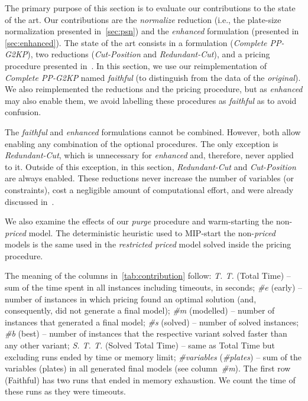 \documentclass[ppgc,prop-tese,english,formais,babel]{iiufrgs}
\begin{document}
The primary purpose of this section is to evaluate our contributions to the state of the art.
Our contributions are the \emph{normalize} reduction (i.e., the plate-size normalization presented in~\cref{sec:psn}) and the \emph{enhanced} formulation (presented in \cref{sec:enhanced}).
The state of the art consists in a formulation (\emph{Complete PP-G2KP}), two reductions (\emph{Cut-Position} and \emph{Redundant-Cut}), and a pricing procedure presented in~\citet{furini:2016,dimitri_thesis}.
In this section, we use our reimplementation of \emph{Complete PP-G2KP} named \emph{faithful} (to distinguish from the data of the \emph{original}).
We also reimplemented the reductions and the pricing procedure, but as \emph{enhanced} may also enable them, we avoid labelling these procedures as \emph{faithful} as to avoid confusion.

The \emph{faithful} and \emph{enhanced} formulations cannot be combined.
However, both allow enabling any combination of the optional procedures.
The only exception is \emph{Redundant-Cut}, which is unnecessary for \emph{enhanced} and, therefore, never applied to it.
Outside of this exception, in this section, \emph{Redundant-Cut} and \emph{Cut-Position} are always enabled.
These reductions never increase the number of variables (or constraints), cost a negligible amount of computational effort, and were already discussed in~\citet{furini:2016,dimitri_thesis}.

We also examine the effects of our \emph{purge} procedure and warm-starting the non-\emph{priced} model.
The deterministic heuristic used to MIP-start the non-\emph{priced} models is the same used in the \emph{restricted priced} model solved inside the pricing procedure.

The meaning of the columns in~\cref{tab:contribution} follow:
\emph{T. T.} (Total Time) -- sum of the time spent in all instances including timeouts, in seconds;
\emph{\#e} (early) -- number of instances in which pricing found an optimal solution (and, consequently, did not generate a final model);
\emph{\#m} (modelled) -- number of instances that generated a final model;
\emph{\#s} (solved) -- number of solved instances;
\emph{\#b} (best) -- number of instances that the respective variant solved faster than any other variant;
\emph{S. T. T.} (Solved Total Time) -- same as Total Time but excluding runs ended by time or memory limit;
\emph{\#variables} (\emph{\#plates}) -- sum of the variables (plates) in all generated final models (see column~\emph{\#m}).
The first row (Faithful) has two runs that ended in memory exhaustion.
We count the time of these runs as they were timeouts.
\end{document}
